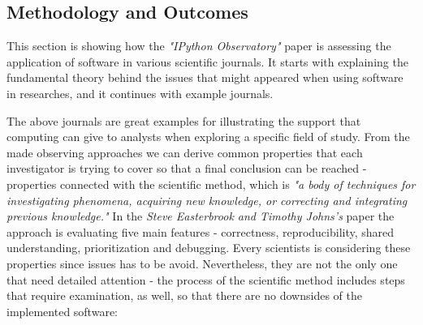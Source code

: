 \subsection*{Methodology and Outcomes}

This section is showing how the \textit{"IPython Observatory"} paper is assessing the application of software in various scientific journals. It starts with explaining the fundamental theory behind the issues that might appeared when using software in researches, and it continues with example journals.

The above journals are great examples for illustrating the support that computing can give to analysts when exploring a specific field of study. From the made observing approaches we can derive common properties that each investigator is trying to cover so that a final conclusion can be reached - properties connected with the scientific method, which is \textit{"a body of techniques for investigating phenomena, acquiring new knowledge, or correcting and integrating previous knowledge."}\cite{sciMethod} In the \textit{Steve Easterbrook and Timothy Johns's} paper   the approach is evaluating five main features - correctness, reproducibility, shared understanding, prioritization and debugging.\cite{easterbrook2009engineering} Every scientists is considering these properties since issues has to be avoid. Nevertheless, they are not the only one that need detailed attention - the process of the scientific method includes steps that require examination, as well, so that there are no downsides of the implemented software:\cite{sciMethod}\cite{chasmSoftware}

